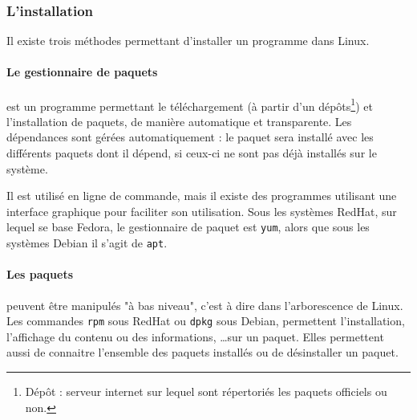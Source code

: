 
\subsubsection{L'installation}
\label{L'installation}

Il existe trois méthodes permettant d'installer un programme dans Linux.

\paragraph{Le gestionnaire de paquets}
est un programme permettant le téléchargement (à partir d'un dépôts\footnote{Dépôt : serveur internet sur lequel sont répertoriés les paquets officiels ou non.}) et l'installation de paquets, de manière automatique et transparente.
Les dépendances sont gérées automatiquement : le paquet sera installé avec les différents paquets dont il dépend, si ceux-ci ne sont pas déjà installés sur le système.

Il est utilisé en ligne de commande, mais il existe des programmes utilisant une interface graphique pour faciliter son utilisation.
Sous les systèmes RedHat, sur lequel se base Fedora, le gestionnaire de paquet est \lstinline{yum}, alors que sous les systèmes Debian il s'agit de \lstinline{apt}.
\\


\paragraph{Les paquets}
peuvent être manipulés "à bas niveau", c'est à dire dans l'arborescence de Linux.
Les commandes \lstinline{rpm} sous RedHat ou \lstinline{dpkg} sous Debian, permettent l'installation, l'affichage du contenu ou des informations, \ldots sur un paquet.
Elles permettent aussi de connaitre l'ensemble des paquets installés ou de désinstaller un paquet.
\\


